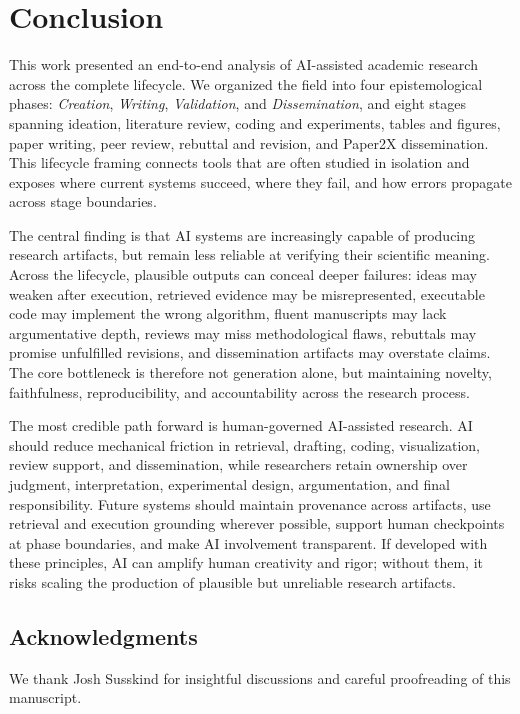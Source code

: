 \documentclass{llmxive}
\begin{document}
\section{Conclusion}
\label{sec:conclusion}

This work presented an end-to-end analysis of AI-assisted academic research across the complete lifecycle. We organized the field into four epistemological phases: \emph{Creation}, \emph{Writing}, \emph{Validation}, and \emph{Dissemination}, and eight stages spanning ideation, literature review, coding and experiments, tables and figures, paper writing, peer review, rebuttal and revision, and Paper2X dissemination. This lifecycle framing connects tools that are often studied in isolation and exposes where current systems succeed, where they fail, and how errors propagate across stage boundaries.

The central finding is that AI systems are increasingly capable of producing research artifacts, but remain less reliable at verifying their scientific meaning. Across the lifecycle, plausible outputs can conceal deeper failures: ideas may weaken after execution, retrieved evidence may be misrepresented, executable code may implement the wrong algorithm, fluent manuscripts may lack argumentative depth, reviews may miss methodological flaws, rebuttals may promise unfulfilled revisions, and dissemination artifacts may overstate claims. The core bottleneck is therefore not generation alone, but maintaining novelty, faithfulness, reproducibility, and accountability across the research process.

The most credible path forward is human-governed AI-assisted research. AI should reduce mechanical friction in retrieval, drafting, coding, visualization, review support, and dissemination, while researchers retain ownership over judgment, interpretation, experimental design, argumentation, and final responsibility. Future systems should maintain provenance across artifacts, use retrieval and execution grounding wherever possible, support human checkpoints at phase boundaries, and make AI involvement transparent. If developed with these principles, AI can amplify human creativity and rigor; without them, it risks scaling the production of plausible but unreliable research artifacts.


\subsection*{Acknowledgments}
We thank Josh Susskind for insightful discussions and careful proofreading of this manuscript. 
\end{document}
